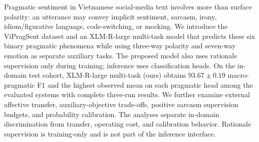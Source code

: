 Pragmatic sentiment in Vietnamese social-media text involves more than surface polarity: an utterance may convey implicit sentiment, sarcasm, irony, idiom/figurative language, code-switching, or mocking. We introduce the ViPragSent dataset and an XLM-R-large multi-task model that predicts these six binary pragmatic phenomena while using three-way polarity and seven-way emotion as separate auxiliary tasks. The proposed model also uses rationale supervision only during training; inference uses classification heads. On the in-domain test cohort, XLM-R-large multi-task (ours) obtains $93.67 \pm 0.19$ macro-pragmatic F1 and the highest observed mean on each pragmatic head among the evaluated systems with complete three-run results. We further examine external affective transfer, auxiliary-objective trade-offs, positive sarcasm supervision budgets, and probability calibration. The analyses separate in-domain discrimination from transfer, operating cost, and calibration behavior. Rationale supervision is training-only and is not part of the inference interface.

